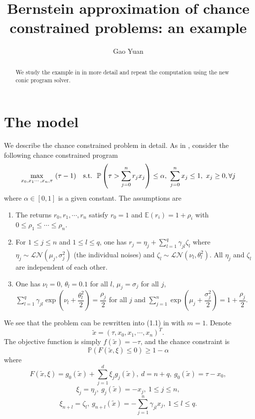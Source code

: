 \documentclass[11pt]{article}
\title{Bernstein approximation of chance constrained problems: an example}
\author{Gao Yuan}
\begin{document}
\maketitle

\begin{abstract}
We study the example in\cite{Nemirovsky_and_Shapiro} in more detail and repeat the computation using the new conic program solver.
\end{abstract}

\section*{The model}
We describe the chance constrained problem in detail. As in \cite{Nemirovsky_and_Shapiro}, consider the following chance constrained program
\begin{align} \label{investment_problem}
\max_{x_0, x_1\cdots,x_n, \tau}\ (\tau - 1)\ \ \ \textnormal{s.t.}\ \ \mathbb{P} \left(\tau > \sum_{j=0}^n r_j x_j \right) \leq \alpha,\ \sum_{j=0}^{n} x_j \leq 1,\ x_j \geq 0, \forall j
\end{align}
where $\alpha \in [0,1]$ is a given constant. The assumptions are 
\begin{enumerate}
	\item The returns $r_0, r_1, \cdots, r_n$ satisfy $r_0=1$ and $\mathbb{E}(r_i) = 1 + \rho_i$ with $0\leq \rho_1 \leq \cdots \leq \rho_n$.
	\item For $1\leq j \leq n$ and $1\leq l \leq q$, one has $r_j = \eta_j + \sum_{l=1}^q \gamma_{jl}\zeta_l$ where $\eta_j \sim \mathcal{LN}(\mu_j, \sigma_j^2)$ (the individual noises) and $\zeta_l \sim \mathcal{LN}(\nu_l, \theta_l^2)$. All $\eta_j$ and $\zeta_l$ are independent of each other.
	\item One has $\nu_l = 0$, $\theta_l=0.1$ for all $l$, $\mu_j = \sigma_j$ for all $j$, $\sum_{l=1}^q \gamma_{jl} \exp \left(\nu_l + \dfrac{\theta_l^2}{2}\right) = \dfrac{\rho_j}{2}$ for all $j$ and $\sum_{j=1}^n \exp\left(\mu_j + \dfrac{\sigma_j^2}{2}\right) = 1 + \dfrac{\rho_j}{2}$.
\end{enumerate}
We see that the problem can be rewritten into (1.1) in \cite{Nemirovsky_and_Shapiro} with $m=1$. Denote \[\tilde{x} = (\tau, x_0, x_1, \cdots, x_n)^T.\] The objective function is simply $f(\tilde{x}) = -\tau$, and the chance constraint is \[\mathbb{P}\left(F(\tilde{x}, \xi) \leq 0 \right) \geq 1-\alpha\] where \[F(\tilde{x},\xi) =g_0(\tilde{x}) + \sum_{j=1}^d \xi_j g_j(\tilde{x}),\ d = n+q,\ g_0(\tilde{x}) = \tau - x_0,\]
\[\xi_j = \eta_j,\ g_j(\tilde{x}) = -x_j,\ 1\leq j \leq n,\] \[\xi_{n+l} = \zeta_l,\ g_{n+l}(\tilde{x}) = -\sum_{j=1}^n \gamma_{jl}x_j,\ 1\leq l \leq q.\]
\end{document}

